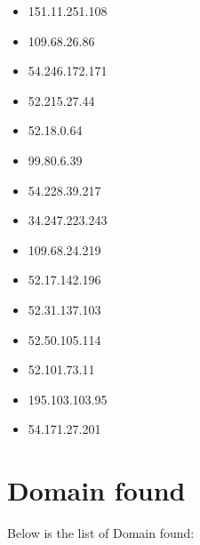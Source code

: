 \documentclass{article}
\begin{document}
\begin{itemize}
        \item 151.11.251.108
    
        \item 109.68.26.86
    
        \item 54.246.172.171
    
        \item 52.215.27.44
    
        \item 52.18.0.64
    
        \item 99.80.6.39
    
        \item 54.228.39.217
    
        \item 34.247.223.243
    
        \item 109.68.24.219
    
        \item 52.17.142.196
    
        \item 52.31.137.103
    
        \item 52.50.105.114
    
        \item 52.101.73.11
    
        \item 195.103.103.95
    
        \item 54.171.27.201
    
\end{itemize}


\section*{Domain found}

Below is the list of Domain found:
\end{document}
